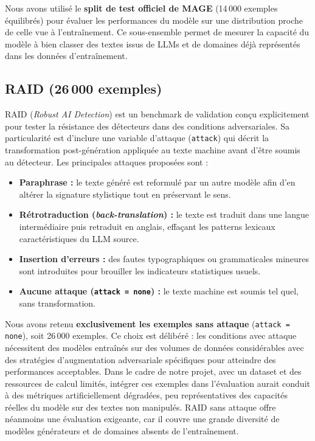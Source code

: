 ﻿\documentclass[12pt, a4paper]{report}
\begin{document}
Nous avons utilisé le \textbf{split de test officiel de MAGE} (14\,000 exemples
équilibrés) pour évaluer les performances du modèle sur une distribution proche
de celle vue à l'entraînement. Ce sous-ensemble permet de mesurer la capacité
du modèle à bien classer des textes issus de LLMs et de domaines déjà représentés
dans les données d'entraînement.

\subsection{RAID (26\,000 exemples)}

RAID (\textit{Robust AI Detection}) est un benchmark de validation conçu
explicitement pour tester la résistance des détecteurs dans des conditions
adversariales. Sa particularité est d'inclure une variable d'attaque
(\texttt{attack}) qui décrit la transformation post-génération appliquée au texte
machine avant d'être soumis au détecteur. Les principales attaques proposées sont :

\begin{itemize}
  \item \textbf{Paraphrase :} le texte généré est reformulé par un autre modèle
        afin d'en altérer la signature stylistique tout en préservant le sens.
  \item \textbf{Rétrotraduction (\textit{back-translation}) :} le texte est
        traduit dans une langue intermédiaire puis retraduit en anglais, effaçant
        les patterns lexicaux caractéristiques du LLM source.
  \item \textbf{Insertion d'erreurs :} des fautes typographiques ou
        grammaticales mineures sont introduites pour brouiller les indicateurs
        statistiques usuels.
  \item \textbf{Aucune attaque (\texttt{attack = none}) :} le texte machine est
        soumis tel quel, sans transformation.
\end{itemize}

Nous avons retenu \textbf{exclusivement les exemples sans attaque}
(\texttt{attack = none}), soit 26\,000 exemples. Ce choix est délibéré : les
conditions avec attaque nécessitent des modèles entraînés sur des volumes de
données considérables avec des stratégies d'augmentation adversariale spécifiques
pour atteindre des performances acceptables. Dans le cadre de notre projet, avec
un dataset et des ressources de calcul limités, intégrer ces exemples dans
l'évaluation aurait conduit à des métriques artificiellement dégradées, peu
représentatives des capacités réelles du modèle sur des textes non manipulés.
RAID sans attaque offre néanmoins une évaluation exigeante, car il couvre une
grande diversité de modèles générateurs et de domaines absents de l'entraînement.
\end{document}
